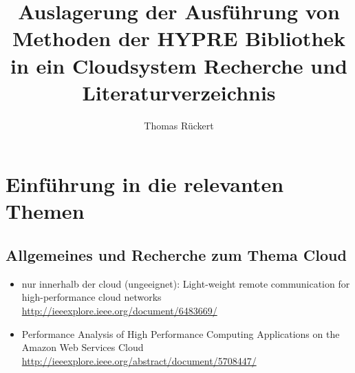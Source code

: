 \documentclass[a4paper,10pt]{article}
\title{Auslagerung der Ausführung von Methoden der HYPRE Bibliothek in ein Cloudsystem
Recherche und Literaturverzeichnis}
\author{Thomas Rückert}
\newcommand{\blankpage}{
\newpage
\thispagestyle{empty}
\mbox{}
\newpage
}
\begin{document}
\newcommand{\mycheckbox}[0]{\makebox[0pt][l]{$\square$}\raisebox{0.15ex}{\hspace{0.1em}$\checkmark$}}
\newcommand{\myuncheckbox}[0]{\makebox[0em][l]{$\square$}\raisebox{0.15ex}{\hspace{0.1em}$ $}}

\newenvironment{boxed}[1]
{\begin{center}Definition\\
\begin{tabular}{|p{0.9\textwidth}|}
\hline\\
\textbf{#1}\\\\
}
{
\\\\\hline
\end{tabular} 
\end{center}
}


\maketitle
\thispagestyle{empty}
\blankpage
\setcounter{page}{1}
\renewcommand{\thepage}{\roman{page}}


\begin{abstract}
\end{abstract}
\blankpage


\tableofcontents
\newpage

\listoffigures
\newpage

\listoftables
\newpage

\lstlistoflistings
\newpage

\listoftodos
\newpage

\setcounter{page}{1}
\renewcommand{\thepage}{\arabic{page}}


\section{Einführung in die relevanten Themen}

\subsection{Allgemeines und Recherche zum Thema Cloud}

\begin{itemize}
 \item nur innerhalb der cloud (ungeeignet): Light-weight remote communication for high-performance cloud networks \url{http://ieeexplore.ieee.org/document/6483669/}
 \item Performance Analysis of High Performance Computing Applications on the Amazon Web Services Cloud \url{http://ieeexplore.ieee.org/abstract/document/5708447/}
\end{itemize}
\end{document}
